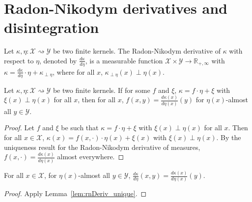 \chapter{Radon-Nikodym derivatives and disintegration}

\begin{definition}
  \label{def:kernel_rnDeriv}
  \leanok
  Let $\kappa, \eta : \mathcal X \rightsquigarrow \mathcal Y$ be two finite kernels. The Radon-Nikodym derivative of $\kappa$ with respect to $\eta$, denoted by $\frac{d \kappa}{d \eta}$, is a measurable function $\mathcal X \times \mathcal Y \to \mathbb{R}_{+, \infty}$ with $\kappa = \frac{d \kappa}{d \eta} \cdot \eta + \kappa_{\perp \eta}$, where for all $x$, $\kappa_{\perp \eta}(x) \perp \eta(x)$.
\end{definition}

\begin{lemma}
  \label{lem:rnDeriv_unique}
  \leanok
  Let $\kappa, \eta : \mathcal X \rightsquigarrow \mathcal Y$ be two finite kernels. If for some $f$ and $\xi$, $\kappa = f \cdot \eta + \xi$ with $\xi(x) \perp \eta(x)$ for all $x$, then for all $x$, $f(x, y) = \frac{d \kappa(x)}{d \eta(x)}(y)$ for $\eta(x)$-almost all $y \in \mathcal Y$.
\end{lemma}

\begin{proof} \leanok
Let $f$ and $\xi$ be such that $\kappa = f \cdot \eta + \xi$ with $\xi(x) \perp \eta(x)$ for all $x$. Then for all $x \in \mathcal X$, $\kappa(x) = f(x, \cdot) \cdot \eta(x) + \xi(x)$ with $\xi(x) \perp \eta(x)$. By the uniqueness result for the Radon-Nikodym derivative of measures, $f(x, \cdot) = \frac{d \kappa(x)}{d \eta(x)}$ almost everywhere.
\end{proof}

\begin{corollary}
  \label{cor:rnDeriv_value}
  \leanok
  For all $x \in \mathcal X$, for $\eta(x)$-almost all $y \in \mathcal Y$, $\frac{d \kappa}{d \eta}(x, y) = \frac{d \kappa(x)}{d \eta(x)}(y)$.
\end{corollary}

\begin{proof} \leanok
{}
Apply Lemma~\ref{lem:rnDeriv_unique}.
\end{proof}

